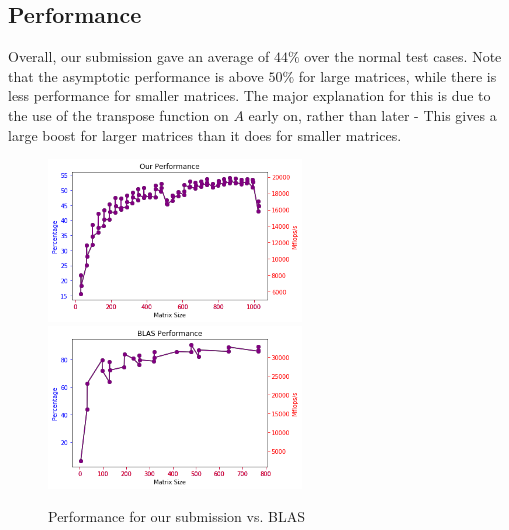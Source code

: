 \documentclass[12pt]{article}
\begin{document}
\subsection{Performance}
Overall, our submission gave an average of $44 \%$ over the normal test cases. Note that the asymptotic performance is above $50 \%$ for large matrices, while there is less performance for smaller matrices. The major explanation for this is due to the use of the transpose function on $A$ early on, rather than later - This gives a large boost for larger matrices than it does for smaller matrices.    
\begin{figure}[h]
  \caption{Performance for our submission vs. BLAS}
  \centering
    \includegraphics[width=0.6\textwidth]{our_performance_graph.png}
     \includegraphics[width=0.6\textwidth]{blas_performance_graph.png}
\end{figure}
\end{document}
